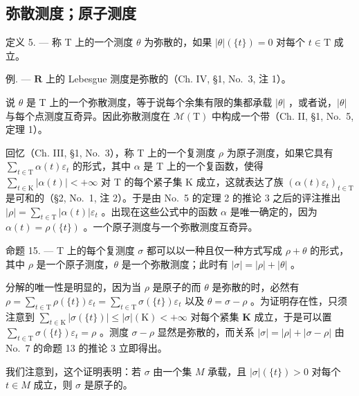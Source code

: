 \subsection{弥散测度；原子测度}

定义 5. --- 称 T 上的一个测度 \(\theta\) 为弥散的，如果 \(|\theta|(\{t\}) = 0\) 对每个 \(t \in \mathrm{T}\) 成立。

例. --- \(\mathbf{R}\) 上的 Lebesgue 测度是弥散的（Ch. IV, §1, No.~3, 注 1）。

说 \(\theta\) 是 T 上的一个弥散测度，等于说每个余集有限的集都承载 \(|\theta|\) ，或者说，\(|\theta|\) 与每个点测度互奇异。因此弥散测度在 \(\mathcal{M}(\mathrm{T})\) 中构成一个带（Ch. II, §1, No.~5, 定理 1）。

回忆（Ch. III, §1, No.~3），称 T 上的一个复测度 \(\rho\) 为原子测度，如果它具有 \(\sum_{t\in \mathrm{T}}\alpha (t)\varepsilon_t\) 的形式，其中 \(\alpha\) 是 T 上的一个复函数，使得 \(\sum_{t\in \mathrm{K}}|\alpha (t)| < +\infty\) 对 T 的每个紧子集 K 成立，这就表达了族 \(\left(\alpha (t)\varepsilon_t\right)_{t\in \mathrm{T}}\) 是可和的（§2, No.~1, 注 2）。于是由 No.~5 的定理 2 的推论 3 之后的评注推出 \(|\rho| = \sum_{t\in \mathrm{T}}|\alpha (t)|\varepsilon_t\) 。出现在这些公式中的函数 \(\alpha\) 是唯一确定的，因为 \(\alpha (t) = \rho (\{t\})\) 。一个原子测度与一个弥散测度互奇异。

命题 15. --- T 上的每个复测度 \(\sigma\) 都可以以一种且仅一种方式写成 \(\rho + \theta\) 的形式，其中 \(\rho\) 是一个原子测度，\(\theta\) 是一个弥散测度；此时有 \(|\sigma| = |\rho| + |\theta|\) 。

分解的唯一性是明显的，因为当 \(\rho\) 是原子的而 \(\theta\) 是弥散的时，必然有 \(\rho = \sum_{t\in \mathrm{T}}\rho (\{t\})\varepsilon_t = \sum_{t\in \mathrm{T}}\sigma (\{t\})\varepsilon_t\) 以及 \(\theta = \sigma -\rho\) 。为证明存在性，只须注意到 \(\sum_{t\in \mathrm{K}}|\sigma (\{t\})| \leqslant |\sigma |(\mathrm{K}) < +\infty\) 对每个紧集 \(\mathbf{K}\) 成立，于是可以置 \(\sum_{t\in \mathrm{T}}\sigma (\{t\})\varepsilon_t = \rho\) 。测度 \(\sigma -\rho\) 显然是弥散的，而关系 \(|\sigma | = |\rho | + |\sigma -\rho |\) 由 No.~7 的命题 13 的推论 3 立即得出。

我们注意到，这个证明表明：若 \(\sigma\) 由一个集 \(M\) 承载，且 \(|\sigma| (\{t\}) > 0\) 对每个 \(t \in M\) 成立，则 \(\sigma\) 是原子的。


